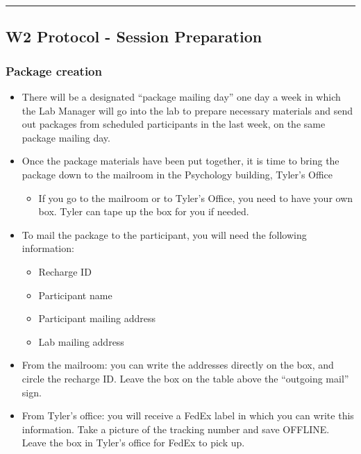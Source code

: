 \documentclass[
]{book}
\providecommand{\tightlist}{%
  \setlength{\itemsep}{0pt}\setlength{\parskip}{0pt}}
\begin{document}
\begin{center}\rule{0.5\linewidth}{0.5pt}\end{center}

\hypertarget{w2-protocol---session-preparation}{%
\subsection{W2 Protocol - Session Preparation}\label{w2-protocol---session-preparation}}

\hypertarget{package-creation-1}{%
\subsubsection{Package creation}\label{package-creation-1}}

\begin{itemize}
\tightlist
\item
  There will be a designated ``package mailing day'' one day a week in which the Lab Manager will go into the lab to prepare necessary materials and send out packages from scheduled participants in the last week, on the same package mailing day.
\item
  Once the package materials have been put together, it is time to bring the package down to the mailroom in the Psychology building, Tyler's Office

  \begin{itemize}
  \tightlist
  \item
    If you go to the mailroom or to Tyler's Office, you need to have your own box. Tyler can tape up the box for you if needed.
  \end{itemize}
\item
  To mail the package to the participant, you will need the following information:

  \begin{itemize}
  \tightlist
  \item
    Recharge ID
  \item
    Participant name
  \item
    Participant mailing address
  \item
    Lab mailing address
  \end{itemize}
\item
  From the mailroom: you can write the addresses directly on the box, and circle the recharge ID. Leave the box on the table above the ``outgoing mail'' sign.\\
\item
  From Tyler's office: you will receive a FedEx label in which you can write this information. Take a picture of the tracking number and save OFFLINE. Leave the box in Tyler's office for FedEx to pick up.
\end{itemize}
\end{document}
